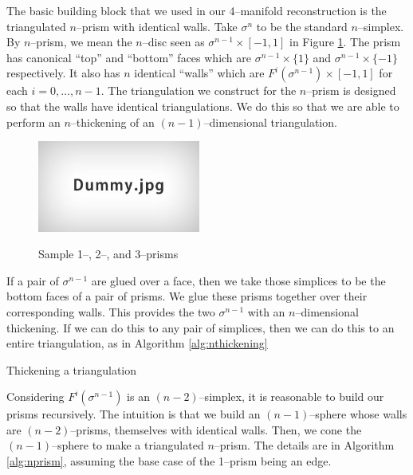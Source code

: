 The basic building block that we used in our 4--manifold reconstruction is the triangulated $n$--prism with identical walls.
Take $\sigma^n$ to be the standard $n$--simplex.
By $n$--prism, we mean the $n$--disc seen as $\sigma^{n-1}\times [-1,1]$ in Figure \ref{fig:nprism}.
The prism has canonical ``top'' and ``bottom'' faces which are $\sigma^{n-1}\times \{1\}$ and $\sigma^{n-1}\times \{-1\}$ respectively.
It also has $n$ identical ``walls'' which are $F^i(\sigma^{n-1})\times [-1,1]$ for each $i=0,\dots,n-1$.
The triangulation we construct for the $n$--prism is designed so that the walls have identical triangulations.
We do this so that we are able to perform an $n$--thickening of an $(n-1)$--dimensional triangulation.

\begin{figure}
	\centering
	\captionsetup{justification=centering}
	\caption{Sample 1--, 2--, and 3--prisms}
	\includegraphics[height=3cm]{figures/dummy.jpg}
	\label{fig:nprism}
\end{figure}

If a pair of $\sigma^{n-1}$ are glued over a face, then we take those simplices to be the bottom faces of a pair of prisms.
We glue these prisms together over their corresponding walls.
This provides the two $\sigma^{n-1}$ with an $n$--dimensional thickening.
If we can do this to any pair of simplices, then we can do this to an entire triangulation, as in Algorithm \ref{alg:nthickening}

\begin{algorithm}[h]
	\caption{Thickening a triangulation}
	\label{alg:nthickening}
\end{algorithm}

Considering $F^i(\sigma^{n-1})$ is an $(n-2)$--simplex, it is reasonable to build our prisms recursively.
The intuition is that we build an $(n-1)$--sphere whose walls are $(n-2)$--prisms, themselves with identical walls.
Then, we cone the $(n-1)$--sphere to make a triangulated $n$--prism.
The details are in Algorithm \ref{alg:nprism}, assuming the base case of the 1--prism being an edge.

